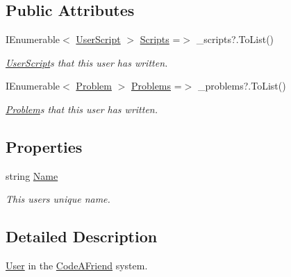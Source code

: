 \subsection*{Public Attributes}
\begin{DoxyCompactItemize}
\item 
I\+Enumerable$<$ \mbox{\hyperlink{class_code_a_friend_1_1_data_model_1_1_user_script}{User\+Script}} $>$ \mbox{\hyperlink{class_code_a_friend_1_1_data_model_1_1_user_ae1e8268cdd9f9abffcf602146de030f5}{Scripts}} =$>$ \+\_\+scripts?.To\+List()
\begin{DoxyCompactList}\small\item\em \mbox{\hyperlink{class_code_a_friend_1_1_data_model_1_1_user_script}{User\+Script}}s that this user has written.\end{DoxyCompactList}\item 
I\+Enumerable$<$ \mbox{\hyperlink{class_code_a_friend_1_1_data_model_1_1_problem}{Problem}} $>$ \mbox{\hyperlink{class_code_a_friend_1_1_data_model_1_1_user_afdc167d3127eb8aae3d5754642b6eff0}{Problems}} =$>$ \+\_\+problems?.To\+List()
\begin{DoxyCompactList}\small\item\em \mbox{\hyperlink{class_code_a_friend_1_1_data_model_1_1_problem}{Problem}}s that this user has written.\end{DoxyCompactList}\end{DoxyCompactItemize}
\subsection*{Properties}
\begin{DoxyCompactItemize}
\item 
string \mbox{\hyperlink{class_code_a_friend_1_1_data_model_1_1_user_ab32bf10478eb4276407dd192fa313954}{Name}}
\begin{DoxyCompactList}\small\item\em This user\textquotesingle{}s unique name.\end{DoxyCompactList}\end{DoxyCompactItemize}


\subsection{Detailed Description}
\mbox{\hyperlink{class_code_a_friend_1_1_data_model_1_1_user}{User}} in the \mbox{\hyperlink{namespace_code_a_friend}{Code\+A\+Friend}} system.



